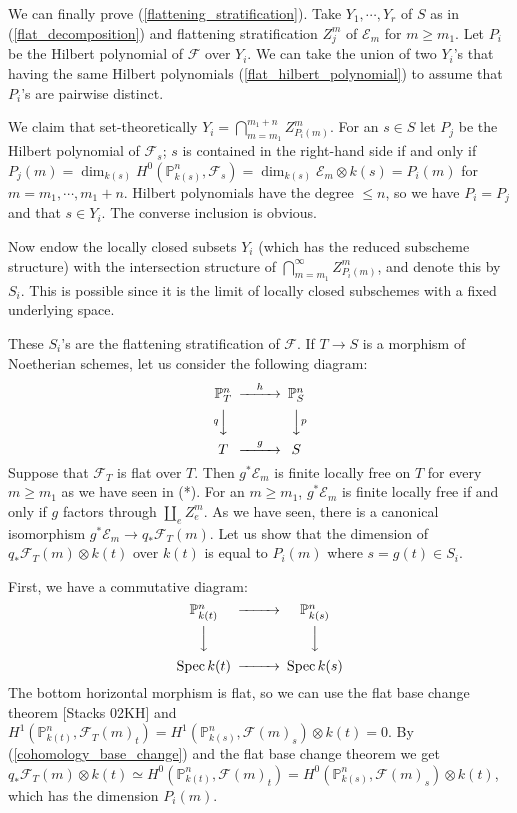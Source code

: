 \documentclass{article}
\theoremstyle{theorem}
\begin{document}
    We can finally prove (\ref{flattening_stratification}). Take $Y_1, \cdots, Y_r$ of $S$ as in (\ref{flat_decomposition}) and flattening stratification $Z^m_j$ of $\mathcal E_m$ for $m \geq m_1$. Let $P_i$ be the Hilbert polynomial of $\mathcal F$ over $Y_i$. We can take the union of two $Y_i$'s that having the same Hilbert polynomials (\ref{flat_hilbert_polynomial}) to assume that $P_i$'s are pairwise distinct.
    
    We claim that set-theoretically $\displaystyle Y_i = \bigcap_{m = m_1}^{m_1 + n} Z^m_{P_i(m)}$. For an $s \in S$ let $P_j$ be the Hilbert polynomial of $\mathcal F_s$; $s$ is contained in the right-hand side if and only if $P_j(m) = \dim_{k(s)} H^0(\mathbb P^n_{k(s)}, \mathcal F_s) = \dim_{k(s)} \mathcal E_m \otimes k(s) = P_i(m)$ for $m = m_1, \cdots, m_1 + n$. Hilbert polynomials have the degree $\leq n$, so we have $P_i = P_j$ and that $s \in Y_i.$ The converse inclusion is obvious.
    
    Now endow the locally closed subsets $Y_i$ (which has the reduced subscheme structure) with the intersection structure of $\displaystyle \bigcap_{m = m_1}^{\infty} Z^m_{P_i(m)}$, and denote this by $S_i$. This is possible since it is the limit of locally closed subschemes with a fixed underlying space.
    
    These $S_i$'s are the flattening stratification of $\mathcal F$. If $T \rightarrow S$ is a morphism of Noetherian schemes, let us consider the following diagram:
        \[
          \begin{CD}
             \mathbb  P^n_T @>{h}>> \mathbb  P^n_S \\
          @V{q}VV    @VV{p}V \\
             T   @>{g}>>  S
          \end{CD}
        \]
        \newline
    Suppose that $\mathcal F_T$ is flat over $T$. Then $g^*\mathcal E_m$ is finite locally free on $T$ for every $m \geq m_1$ as we have seen in (*). For an $m \geq m_1$, $g^*\mathcal E_m$ is finite locally free if and only if $g$ factors through $\coprod_e Z^m_{e}$. As we have seen, there is a canonical isomorphism $g^*\mathcal E_m \rightarrow q_*\mathcal F_T(m)$. Let us show that the dimension of $q_*\mathcal F_T(m) \otimes k(t)$ over $k(t)$ is equal to $P_i(m)$ where $s = g(t) \in S_i.$
    
    First, we have a commutative diagram:
        \[
          \begin{CD}
             \mathbb  P^n_{k(t)} @>>> \mathbb  P^n_{k(s)} \\
          @VVV    @VVV \\
             \operatorname{Spec} k(t)   @>>>  \operatorname{Spec} k(s)
          \end{CD}
        \]
    The bottom horizontal morphism is flat, so we can use the flat base change theorem {[Stacks 02KH]} and $H^1(\mathbb P^n_{k(t)}, \mathcal F_T(m)_t) = H^1(\mathbb P^n_{k(s)}, \mathcal F(m)_s) \otimes k(t) = 0$. By (\ref{cohomology_base_change}) and the flat base change theorem we get $q_*\mathcal F_T(m) \otimes k(t) \simeq H^0(\mathbb P^n_{k(t)}, \mathcal F(m)_t) = H^0(\mathbb P^n_{k(s)}, \mathcal F(m)_s) \otimes k(t)$, which has the dimension $P_i(m)$.
    
\end{document}
